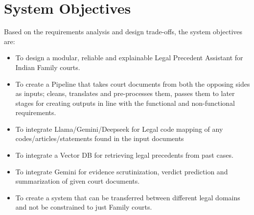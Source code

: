 %

\section{System Objectives}
Based on the requirements analysis and design trade-offs, the system objectives are:
\begin{itemize}
    \item To design a modular, reliable and explainable Legal Precedent Assistant for Indian Family courts.
    \item To create a Pipeline that takes court documents from both the opposing sides as inputs; cleans, translates and pre-processes them, passes them to later stages for creating outputs in line with the functional and non-functional requirements.
    \item To integrate Llama/Gemini/Deepseek for Legal code mapping of any codes/articles/statements found in the input documents
    \item To integrate a Vector DB for retrieving legal precedents from past cases. 
    \item To integrate Gemini for evidence scrutinization, verdict prediction and summarization of given court documents.
    \item To create a system that can be transferred between different legal domains and not be constrained to just Family courts.
\end{itemize}

